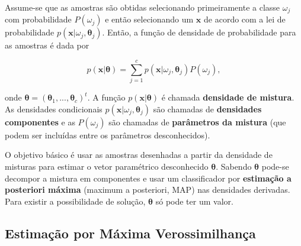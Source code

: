 \documentclass[a4paper,12pt,twocolumn]{article}
\begin{document}
Assume-se que as amostras são obtidas selecionando primeiramente a classe $\omega_j$ com probabilidade $P(\omega_j)$ e então selecionando um $\boldsymbol{x}$ de acordo com a lei de probabilidade $p(\boldsymbol{x}|\omega_j, \boldsymbol{\theta}_j)$. Então, a função de densidade de probabilidade para as amostras é dada por

\begin{equation}
    p(\boldsymbol{x}|\boldsymbol{\theta}) = \sum_{j=1}^c p(\boldsymbol{x}|\omega_j, \boldsymbol{\theta}_j) P(\omega_j),
    \label{eq:pdf_mixtures}
\end{equation}

\noindent onde $\boldsymbol{\theta} = (\boldsymbol{\theta}_1, ..., \boldsymbol{\theta}_c)^t$. A função $p(\boldsymbol{x}|\boldsymbol{\theta})$ é chamada \textbf{densidade de mistura}. As densidades condicionais $p(\boldsymbol{x}|\omega_j, \boldsymbol{\theta}_j)$ são chamadas de \textbf{densidades componentes} e as $P(\omega_j)$ são chamadas de \textbf{parâmetros da mistura} (que podem ser incluídas entre os parâmetros desconhecidos).

O objetivo básico é usar as amostras desenhadas a partir da densidade de misturas para estimar o vetor paramétrico desconhecido $\boldsymbol{\theta}$. Sabendo $\boldsymbol{\theta}$ pode-se decompor a mistura em componentes e usar um classificador por \textbf{estimação a posteriori máxima} (maximum a posteriori, MAP) nas densidades derivadas. Para existir a possibilidade de solução, $\boldsymbol{\theta}$ só pode ter um valor.

\subsection{Estimação por Máxima Verossimilhança}
\end{document}
